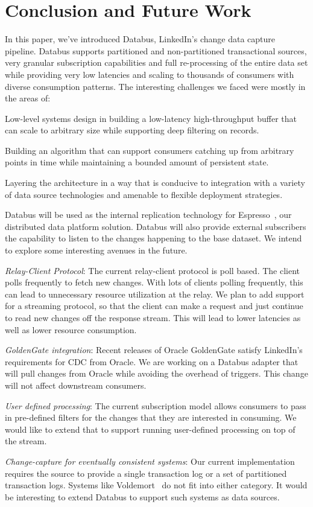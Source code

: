 \section{Conclusion and Future Work}
In this paper, we've introduced Databus, LinkedIn's change data capture pipeline. 
Databus supports partitioned and non-partitioned transactional sources, very granular subscription capabilities and full re-processing of the entire data set while providing very low latencies and scaling to thousands of consumers with diverse consumption patterns. 
The interesting challenges we faced were mostly in the areas of:
\begin{itemize*}
\item Low-level systems design in building a low-latency high-throughput buffer that can scale to arbitrary size while supporting deep filtering on records.
\item Building an algorithm that can support consumers catching up from arbitrary points in time while maintaining a bounded amount of persistent state.
\item Layering the architecture in a way that is conducive to integration with a variety of data source technologies and amenable to flexible deployment strategies.
\end{itemize*}

Databus will be used as the internal replication technology for Espresso~\cite{linkedin12}, our distributed data platform solution. Databus will also provide external subscribers the capability to listen to the changes happening to the base dataset. We intend to explore some interesting avenues in the future. 
\begin{itemize*}
\item \emph{Relay-Client Protocol}: The current relay-client protocol is poll based. The client polls frequently to fetch new changes. With lots of clients polling frequently, this can lead to unnecessary resource utilization at the relay. We plan to add support for a streaming protocol, so that the client can make a request and just continue to read new changes off the response stream. This will lead to lower latencies as well as lower resource consumption. 
\item \emph{GoldenGate integration}: Recent releases of Oracle GoldenGate satisfy LinkedIn's requirements for CDC from Oracle. We are working on a Databus adapter that will pull changes from Oracle while avoiding the overhead of triggers. This change will not affect downstream consumers.
\item \emph{User defined processing}: The current subscription model allows consumers to pass in pre-defined filters for the changes that they are interested in consuming. We would like to extend that to support running user-defined processing on top of the stream. 
\item \emph{Change-capture for eventually consistent systems}: Our current implementation requires the source to provide a single transaction log or a set of partitioned transaction logs. Systems like Voldemort~\cite{linkedin12} do not fit into either category. It would be interesting to extend Databus to support such systems as data sources. 
\end{itemize*}
